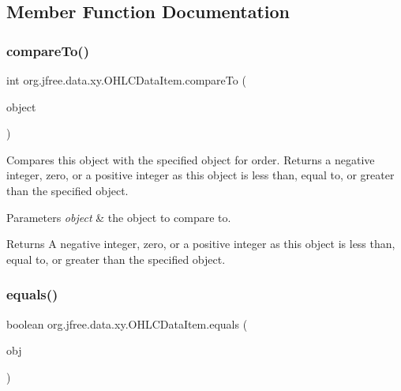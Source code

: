 \subsection{Member Function Documentation}
\mbox{\label{classorg_1_1jfree_1_1data_1_1xy_1_1_o_h_l_c_data_item_acdd858d92e12bcaa6143deb42c47ed8d}} 
\subsubsection{\texorpdfstring{compare\+To()}{compareTo()}}
{\footnotesize\ttfamily int org.\+jfree.\+data.\+xy.\+O\+H\+L\+C\+Data\+Item.\+compare\+To (\begin{DoxyParamCaption}\item[{Object}]{object }\end{DoxyParamCaption})}

Compares this object with the specified object for order. Returns a negative integer, zero, or a positive integer as this object is less than, equal to, or greater than the specified object.


\begin{DoxyParams}{Parameters}
{\em object} & the object to compare to.\\
\hline
\end{DoxyParams}
\begin{DoxyReturn}{Returns}
A negative integer, zero, or a positive integer as this object is less than, equal to, or greater than the specified object. 
\end{DoxyReturn}
\mbox{\label{classorg_1_1jfree_1_1data_1_1xy_1_1_o_h_l_c_data_item_a0d85c5c782d4fa4ec8ad8fd3ddb5df5c}} 
\subsubsection{\texorpdfstring{equals()}{equals()}}
{\footnotesize\ttfamily boolean org.\+jfree.\+data.\+xy.\+O\+H\+L\+C\+Data\+Item.\+equals (\begin{DoxyParamCaption}\item[{Object}]{obj }\end{DoxyParamCaption})}

